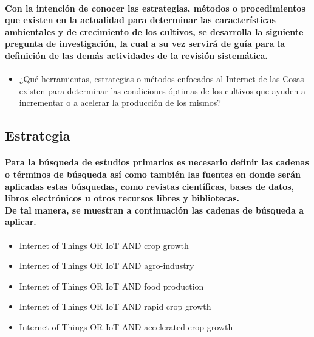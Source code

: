 \documentclass[10pt, twocolumn]{article}
\begin{document}
\paragraph{Con la intención de conocer las estrategias, métodos o procedimientos que existen en la actualidad para determinar las características ambientales y de crecimiento de los cultivos, se desarrolla la siguiente pregunta de investigación, la cual a su vez servirá de guía para la definición de las demás actividades de la revisión sistemática.}
\begin{itemize}
	\item{¿Qué herramientas, estrategias o métodos enfocados al Internet de las Cosas existen para determinar las condiciones óptimas de los cultivos que ayuden a incrementar o a acelerar la producción de los mismos?}
\end{itemize}

\subsection{Estrategia}
\paragraph{Para la búsqueda de estudios primarios es necesario definir las cadenas o términos de búsqueda así como también las fuentes en donde serán aplicadas estas búsquedas, como revistas científicas, bases de datos, libros electrónicos u otros recursos libres y bibliotecas. \\ De tal manera, se muestran a continuación las cadenas de búsqueda a aplicar.}
\begin{itemize}
	\item{Internet of Things OR IoT AND crop growth}
	\item{Internet of Things OR IoT AND agro-industry}
	\item{Internet of Things OR IoT AND food production}
	\item{Internet of Things OR IoT AND rapid crop growth}
	\item{Internet of Things OR IoT AND accelerated crop growth}
\end{itemize}
\end{document}
